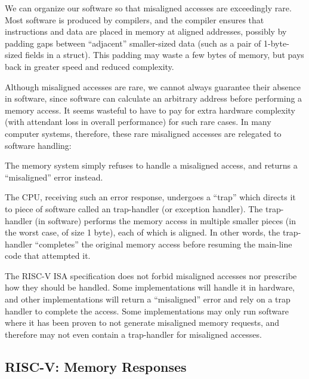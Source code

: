 We can organize our software so that misaligned accesses are
exceedingly rare.  Most software is produced by compilers, and the
compiler ensures that instructions and data are placed in memory at
aligned addresses, possibly by padding gaps between ``adjacent''
smaller-sized data (such as a pair of 1-byte-sized fields in a
struct).  This padding may waste a few bytes of memory, but pays back
in greater speed and reduced complexity.

Although misaligned accesses are rare, we cannot always guarantee
their absence in software, since software can calculate an arbitrary
address before performing a memory access.  It seems wasteful to have
to pay for extra hardware complexity (with attendant loss in overall
performance) for such rare cases.  In many computer systems,
therefore, these rare misaligned accesses are relegated to software
handling:

\begin{tightlist}

\item The memory system simply refuses to handle a misaligned access,
  and returns a ``misaligned'' error instead.

\item The CPU, receiving such an error response, undergoes a ``trap''
  which directs it to piece of software called an trap-handler (or
  exception handler).  The trap-handler (in software) performs the
  memory access in multiple smaller pieces (in the worst case, of size
  1 byte), each of which is aligned.  In other words, the trap-handler
  ``completes'' the original memory access before resuming the
  main-line code that attempted it.

\end{tightlist}

The RISC-V ISA specification does not forbid misaligned accesses nor
prescribe how they should be handled.  Some implementations will
handle it in hardware, and other implementations will return a
``misaligned'' error and rely on a trap handler to complete the
access.  Some implementations may only run software where it has been
proven to not generate misaligned memory requests, and therefore may
not even contain a trap-handler for misaligned accesses.


\subsection{RISC-V: Memory Responses}

